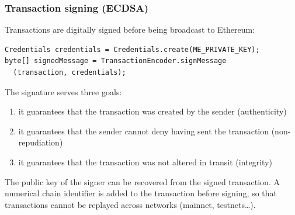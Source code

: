 \documentclass[11pt]{beamer}  %
\begin{document}
\begin{frame}[fragile]\frametitle{Transaction signing (ECDSA)}

  Transactions are digitally signed before being broadcast to Ethereum:

{\small\begin{verbatim}
Credentials credentials = Credentials.create(ME_PRIVATE_KEY);
byte[] signedMessage = TransactionEncoder.signMessage
  (transaction, credentials);
\end{verbatim}}

  The signature serves three goals:
  \begin{enumerate}
  \item it guarantees that the transaction was created by the sender (\alert{authenticity})
  \item it guarantees that the sender cannot deny having sent the transaction (\alert{non-repudiation})
  \item it guarantees that the transaction was not altered in transit (\alert{integrity})
  \end{enumerate}

  \bigskip

  \begin{greenbox}{}
    The public key of the signer can be recovered from the signed transaction.
    A numerical chain identifier is added to the transaction before signing,
    so that transactions cannot be replayed across networks
    (mainnet, testnets\ldots).
  \end{greenbox}
\end{frame}
\end{document}
